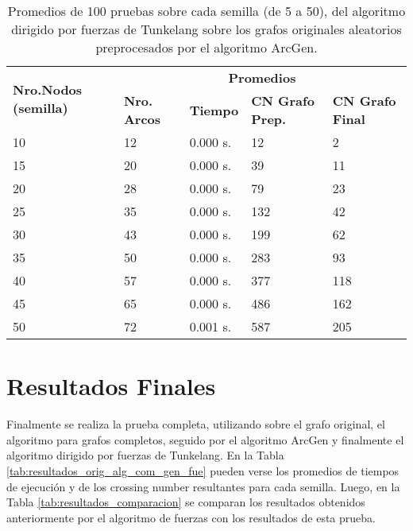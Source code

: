\begin{table}[H]
	\caption{Promedios de 100 pruebas sobre cada semilla (de 5 a 50), del algoritmo dirigido por fuerzas de Tunkelang sobre los grafos originales aleatorios preprocesados por el algoritmo ArcGen.}
	\label{tab:resultados_gen_alg_fue}
	\begin{tabularx}{\linewidth}{|X|X|p{1.5cm}|X|X|}
		\hline
		\multirow{2}{2cm}{\textbf{Nro.Nodos (semilla)}} & \multicolumn{4}{c|}{\textbf{Promedios}} \\
		\cline{2-5}
		& \textbf{Nro. Arcos} & \textbf{Tiempo} & \textbf{CN Grafo Prep.} & \textbf{CN Grafo Final} \\
		\hline
		10 & 12 & 0.000 s. & 12 & 2 \\
		\hline
		15 & 20 & 0.000 s. & 39 & 11 \\
		\hline
		20 & 28 & 0.000 s. & 79 & 23 \\
		\hline
		25 & 35 & 0.000 s. & 132 & 42 \\
		\hline
		30 & 43 & 0.000 s. & 199 & 62 \\
		\hline
		35 & 50 & 0.000 s. & 283 & 93 \\
		\hline
		40 & 57 & 0.000 s. & 377 & 118 \\
		\hline
		45 & 65 & 0.000 s. & 486 & 162 \\
		\hline
		50 & 72 & 0.001 s. & 587 & 205 \\
		\hline
	\end{tabularx}
\end{table}

\section{Resultados Finales}
\label{sec:resultados_finales}
Finalmente se realiza la prueba completa, utilizando sobre el grafo original, el algoritmo para grafos completos, seguido por el algoritmo ArcGen y finalmente el algoritmo dirigido por fuerzas de Tunkelang. En la Tabla \ref{tab:resultados_orig_alg_com_gen_fue} pueden verse los promedios de tiempos de ejecución y de los crossing number resultantes para cada semilla. Luego, en la Tabla \ref{tab:resultados_comparacion} se comparan los resultados obtenidos anteriormente por el algoritmo de fuerzas con los resultados de esta prueba.
	
